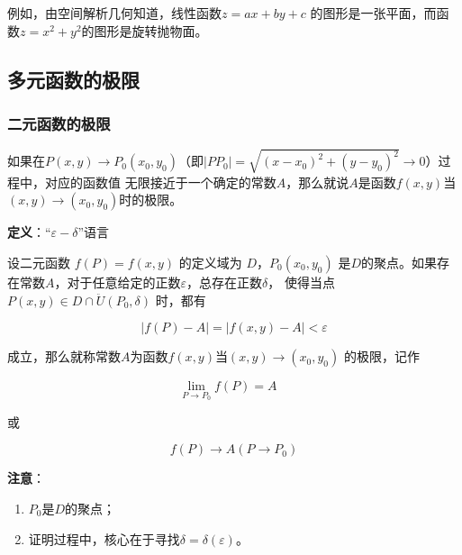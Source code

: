 \documentclass[12pt, a4paper]{article}
\numberwithin{equation}{section}
\begin{document}
    例如，由空间解析几何知道，线性函数$z=ax+by+c$
    的图形是一张平面，而函数$z=x^2+y^2$的图形是旋转抛物面。

\subsection{多元函数的极限}

\subsubsection{二元函数的极限}

    如果在\(P\left(x,y\right) \rightarrow P_0\left(x_0,y_0\right)\)（即\(\left|PP_0\right| =
    \sqrt{\left(x-x_0\right)^2 + \left(y-y_0\right)^2} \rightarrow 0\)）过程中，对应的函数值
    无限接近于一个确定的常数\(A\)，那么就说\(A\)是函数\(f\left(x,y\right)\)当
    \(\left(x,y\right) \rightarrow \left(x_0,y_0\right)\)时的极限。

    \textbf{定义}：“\(\varepsilon - \delta\)”语言

    设二元函数 $f(P)=f(x, y)$ 的定义域为 $D$，$P_0\left(x_0, y_0\right)$
    是$D$的聚点。如果存在常数$A$，对于任意给定的正数$\varepsilon$，总存在正数$\delta$，
    使得当点$P(x, y) \in D \cap \ddot{U}\left(P_0, \delta\right)$ 时，都有

    \begin{equation}
        \left|f(P)-A\right|=\left|f(x, y)-A\right|<\varepsilon
    \end{equation}

    成立，那么就称常数\(A\)为函数\(f\left(x,y\right)\)当\(\left(x,y\right) \rightarrow \left(x_0,y_0\right)\)
    的极限，记作

    \begin{equation}
        \lim _{P \rightarrow P_0} f(P)=A \quad
    \end{equation}

    或

    \begin{equation}
        f(P) \rightarrow A\left(P \rightarrow P_0\right)
    \end{equation}

    \textbf{注意}：

    \begin{enumerate}
        \item \(P_0\)是\(D\)的聚点；
        \item 证明过程中，核心在于寻找\(\delta = \delta\left(\varepsilon\right)\)。
    \end{enumerate}
\end{document}
